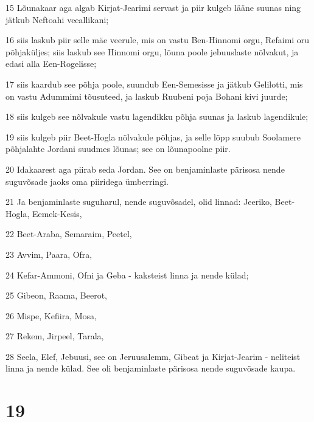 \par 15 Lõunakaar aga algab Kirjat-Jearimi servast ja piir kulgeb lääne suunas ning jätkub Neftoahi veeallikani;
\par 16 siis laskub piir selle mäe veerule, mis on vastu Ben-Hinnomi orgu, Refaimi oru põhjaküljes; siis laskub see Hinnomi orgu, lõuna poole jebuuslaste nõlvakut, ja edasi alla Een-Rogelisse;
\par 17 siis kaardub see põhja poole, suundub Een-Semesisse ja jätkub Gelilotti, mis on vastu Adummimi tõusuteed, ja laskub Ruubeni poja Bohani kivi juurde;
\par 18 siis kulgeb see nõlvakule vastu lagendikku põhja suunas ja laskub lagendikule;
\par 19 siis kulgeb piir Beet-Hogla nõlvakule põhjas, ja selle lõpp suubub Soolamere põhjalahte Jordani suudmes lõunas; see on lõunapoolne piir.
\par 20 Idakaarest aga piirab seda Jordan. See on benjaminlaste pärisosa nende suguvõsade jaoks oma piiridega ümberringi.
\par 21 Ja benjaminlaste suguharul, nende suguvõsadel, olid linnad: Jeeriko, Beet-Hogla, Eemek-Kesis,
\par 22 Beet-Araba, Semaraim, Peetel,
\par 23 Avvim, Paara, Ofra,
\par 24 Kefar-Ammoni, Ofni ja Geba - kaksteist linna ja nende külad;
\par 25 Gibeon, Raama, Beerot,
\par 26 Mispe, Kefiira, Mosa,
\par 27 Rekem, Jirpeel, Tarala,
\par 28 Seela, Elef, Jebuusi, see on Jeruusalemm, Gibeat ja Kirjat-Jearim - neliteist linna ja nende külad. See oli benjaminlaste pärisosa nende suguvõsade kaupa.

\chapter{19}

